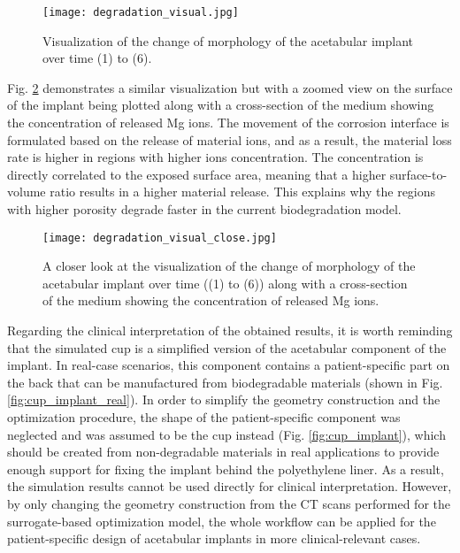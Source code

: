 \begin{figure}[h]
\centering
\medskip
\texttt{[image: degradation\_visual.jpg]}
\caption[Visualization of the change of morphology of the acetabular implant]{Visualization of the change of morphology of the acetabular implant over time (1) to (6).} \label{fig:cup_degradation_visual}
\end{figure}

Fig. \ref{fig:cup_degradation_visual_close} demonstrates a similar visualization but with a zoomed view on the surface of the implant being plotted along with a cross-section of the medium showing the concentration of released Mg ions. The movement of the corrosion interface is formulated based on the release of material ions, and as a result, the material loss rate is higher in regions with higher ions concentration. The concentration is directly correlated to the exposed surface area, meaning that a higher surface-to-volume ratio results in a higher material release. This explains why the regions with higher porosity degrade faster in the current biodegradation model.%

\begin{figure}[h]
\centering
\medskip
\texttt{[image: degradation\_visual\_close.jpg]}
\caption[Visualization of the change of morphology of the acetabular implant]{A closer look at the visualization of the change of morphology of the acetabular implant over time ((1) to (6)) along with a cross-section of the medium showing the concentration of released Mg ions.} \label{fig:cup_degradation_visual_close}
\end{figure}

Regarding the clinical interpretation of the obtained results, it is worth reminding that the simulated cup is a simplified version of the acetabular component of the implant. In real-case scenarios, this component contains a patient-specific part on the back that can be manufactured from biodegradable materials (shown in Fig. \ref{fig:cup_implant_real}). In order to simplify the geometry construction and the optimization procedure, the shape of the patient-specific component was neglected and was assumed to be the cup instead (Fig. \ref{fig:cup_implant}), which should be created from non-degradable materials in real applications to provide enough support for fixing the implant behind the polyethylene liner. As a result, the simulation results cannot be used directly for clinical interpretation. However, by only changing the geometry construction from the {CT} scans performed for the surrogate-based optimization model, the whole workflow can be applied for the patient-specific design of acetabular implants in more clinical-relevant cases.

